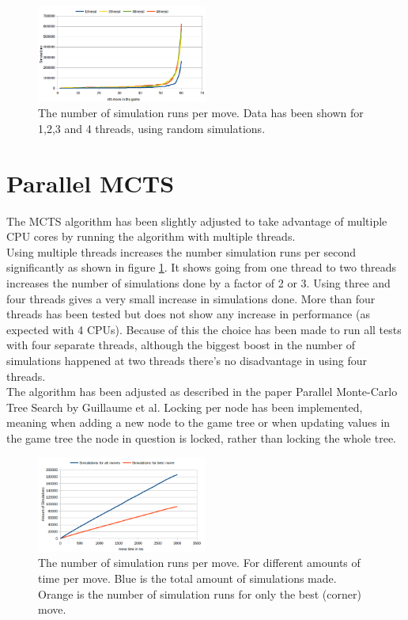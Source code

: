 \documentclass[
11pt, %
english, %
singlespacing, %
headsepline, %
]{MastersDoctoralThesis} %
\begin{document}
\begin{figure}[h]
	\centering
	\includegraphics[width=0.5\textwidth]{images/mcts-simulations-threads}
	\caption{The number of simulation runs per move. Data has been shown for 1,2,3 and 4 threads, using random simulations.}
	\label{fig:mcts-threads}
\end{figure}

\section{Parallel MCTS}

The MCTS algorithm has been slightly adjusted to take advantage of multiple CPU cores by running the algorithm with multiple threads.\\

Using multiple threads increases the number simulation runs per second significantly as shown in figure \ref{fig:mcts-threads}. It shows going from one thread to two threads increases the number of simulations done by a factor of 2 or 3. Using three and four threads gives a very small increase in simulations done. More than four threads has been tested but does not show any increase in performance (as expected with 4 CPUs). Because of this the choice has been made to run all tests with four separate threads, although the biggest boost in the number of simulations happened at two threads there's no disadvantage in using four threads.\\

The algorithm has been adjusted as described in the paper Parallel Monte-Carlo Tree Search\cite{chaslot2008parallel} by Guillaume et al. Locking per node has been implemented, meaning when adding a new node to the game tree or when updating values in the game tree the node in question is locked, rather than locking the whole tree.

\begin{figure}
	\centering
	\includegraphics[width=0.5\textwidth]{images/simulations-time}
	\caption{The number of simulation runs per move. For different amounts of time per move. Blue is the total amount of simulations made. Orange is the number of simulation runs for only the best (corner) move.}
	\label{fig:mcts-simulations-time}
\end{figure}
\end{document}
